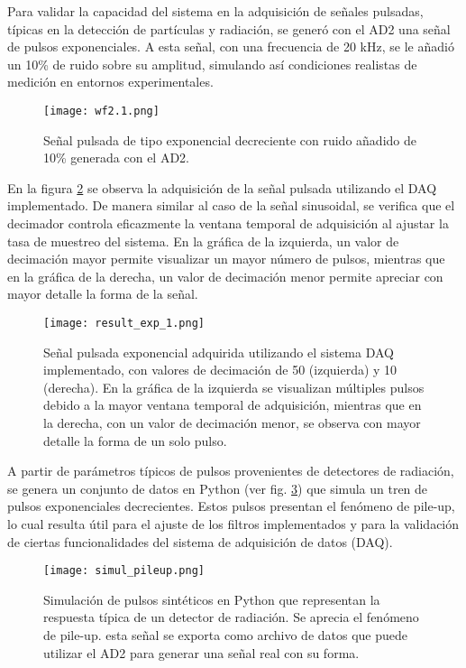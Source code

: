 \documentclass{report}
\begin{document}
\noindent Para validar la capacidad del sistema en la adquisición de señales pulsadas, típicas en la detección de partículas y radiación, se generó con el AD2 una señal de pulsos exponenciales. A esta señal, con una frecuencia de 20 kHz, se le añadió un 10\% de ruido sobre su amplitud, simulando así condiciones realistas de medición en entornos experimentales.

\begin{figure}[H]
    \centering
    \texttt{[image: wf2.1.png]}
    \caption{Señal pulsada de tipo exponencial decreciente con ruido añadido de 10\% generada con el AD2.}
    \label{fig:signal2.1DAQ}
\end{figure}

\noindent En la figura \ref{fig:signalexpDAQ} se observa la adquisición de la señal pulsada utilizando el DAQ implementado. De manera similar al caso de la señal sinusoidal, se verifica que el decimador controla eficazmente la ventana temporal de adquisición al ajustar la tasa de muestreo del sistema. En la gráfica de la izquierda, un valor de decimación mayor permite visualizar un mayor número de pulsos, mientras que en la gráfica de la derecha, un valor de decimación menor permite apreciar con mayor detalle la forma de la señal.

\begin{figure}[H]
    \centering
    \texttt{[image: result\_exp\_1.png]}
    \caption{Señal pulsada exponencial adquirida utilizando el sistema DAQ implementado, con valores de decimación de 50 (izquierda) y 10 (derecha). En la gráfica de la izquierda se visualizan múltiples pulsos debido a la mayor ventana temporal de adquisición, mientras que en la derecha, con un valor de decimación menor, se observa con mayor detalle la forma de un solo pulso.}
    \label{fig:signalexpDAQ}
\end{figure}

A partir de parámetros típicos de pulsos provenientes de detectores de radiación, se genera un conjunto de datos en Python (ver fig. \ref{fig:pulses_pileup}) que simula un tren de pulsos exponenciales decrecientes. Estos pulsos presentan el fenómeno de pile-up, lo cual resulta útil para el ajuste de los filtros implementados y para la validación de ciertas funcionalidades del sistema de adquisición de datos (DAQ).

\begin{figure}[H]
    \centering
    \texttt{[image: simul\_pileup.png]}
    \caption{Simulación de pulsos sintéticos en Python que representan la respuesta típica de un detector de radiación. Se aprecia el fenómeno de pile-up. esta señal se exporta como archivo de datos que puede utilizar el AD2 para generar una señal real con su forma.}
    \label{fig:pulses_pileup}
\end{figure}
\end{document}
